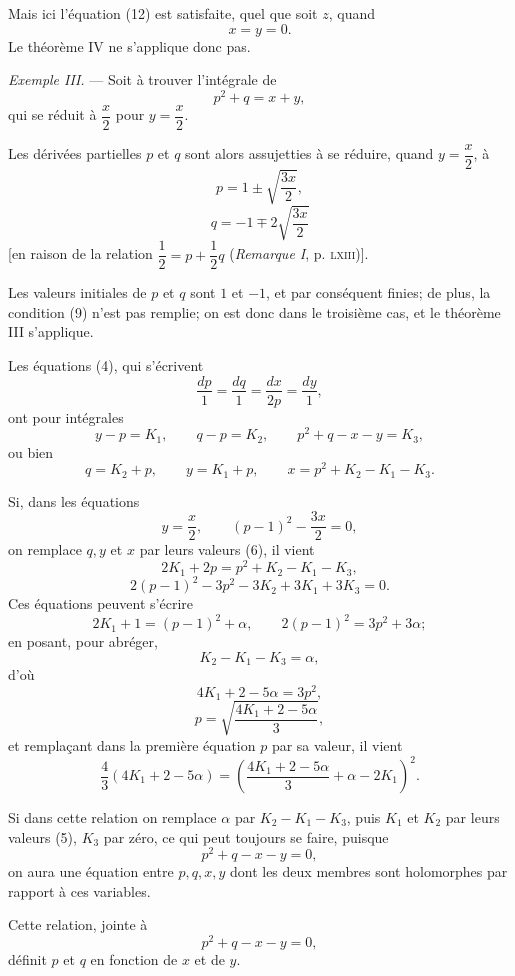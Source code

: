 \documentclass[11pt]{article}
\begin{document}
Mais ici l’équation (12) est satisfaite, quel que soit $z$, quand
\[
x=y=0.
\]
Le théorème IV ne s’applique donc pas.

\emph{Exemple III.} — Soit à trouver l’intégrale de
\[
p^2+q=x+y,
\]
qui se réduit à $\dfrac{x}{2}$ pour $y=\dfrac{x}{2}$.

Les dérivées partielles $p$ et $q$ sont alors assujetties à se réduire, quand $y=\dfrac{x}{2}$, à
\[
p=1\pm\sqrt{\frac{3x}{2}},
\]
\[
q=-1\mp 2\sqrt{\frac{3x}{2}}
\]
[en raison de la relation $\dfrac12=p+\dfrac12q$ (\emph{Remarque I}, p. \textsc{lxiii})].

Les valeurs initiales de $p$ et $q$ sont $1$ et $-1$, et par conséquent finies; de plus, la condition (9) n’est pas remplie; on est donc dans le troisième cas, et le théorème III s’applique.

Les équations (4), qui s’écrivent
\[
\frac{dp}{1}=\frac{dq}{1}=\frac{dx}{2p}=\frac{dy}{1},
\]
ont pour intégrales
\begin{equation*}\tag{5}
y-p=K_1,
\qquad q-p=K_2,
\qquad p^2+q-x-y=K_3,
\end{equation*}
ou bien
\begin{equation*}\tag{6}
q=K_2+p,
\qquad y=K_1+p,
\qquad x=p^2+K_2-K_1-K_3.
\end{equation*}

Si, dans les équations
\[
y=\frac{x}{2},
\qquad (p-1)^2-\frac{3x}{2}=0,
\]
on remplace $q,y$ et $x$ par leurs valeurs (6), il vient
\[
2K_1+2p=p^2+K_2-K_1-K_3,
\]
\[
2(p-1)^2-3p^2-3K_2+3K_1+3K_3=0.
\]
Ces équations peuvent s’écrire
\[
2K_1+1=(p-1)^2+\alpha,
\qquad 2(p-1)^2=3p^2+3\alpha;
\]
en posant, pour abréger,
\[
K_2-K_1-K_3=\alpha,
\]
d’où
\[
4K_1+2-5\alpha=3p^2,
\]
\begin{equation*}\tag{13}
p=\sqrt{\frac{4K_1+2-5\alpha}{3}},
\end{equation*}
et remplaçant dans la première équation $p$ par sa valeur, il vient
\begin{equation*}\tag{14}
\frac{4}{3}(4K_1+2-5\alpha)=
\left(\frac{4K_1+2-5\alpha}{3}+\alpha-2K_1\right)^2.
\end{equation*}

Si dans cette relation on remplace $\alpha$ par $K_2-K_1-K_3$, puis $K_1$ et $K_2$ par leurs valeurs (5), $K_3$ par zéro, ce qui peut toujours se faire, puisque
\[
p^2+q-x-y=0,
\]
on aura une équation entre $p,q,x,y$ dont les deux membres sont holomorphes par rapport à ces variables.

Cette relation, jointe à
\[
p^2+q-x-y=0,
\]
définit $p$ et $q$ en fonction de $x$ et de $y$.
\end{document}
